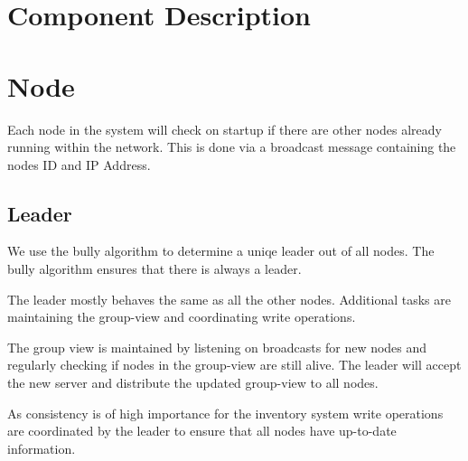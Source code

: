 \chapter{Component Description} \label{ch:ComponentDescription}

\chapter{Node} \label{ch:Node}
Each node in the system will check on startup if there are other nodes already running within the network. This is done via a broadcast message containing the nodes ID and IP Address. 

\section{Leader} \label{sec:Leader}
We use the bully algorithm to determine a uniqe leader out of all nodes.
The bully algorithm ensures that there is always a leader.

The leader mostly behaves the same as all the other nodes. Additional tasks are maintaining the group-view and coordinating write operations.

The group view is maintained by listening on broadcasts for new nodes and regularly checking if nodes in the group-view are still alive. The leader will accept the new server and distribute the updated group-view to all nodes. 

As consistency is of high importance for the inventory system write operations are coordinated by the leader to ensure that all nodes have up-to-date information. 

